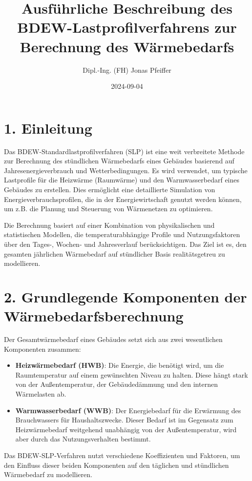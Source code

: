 \documentclass{article}
\title{Ausführliche Beschreibung des BDEW-Lastprofilverfahrens zur Berechnung des Wärmebedarfs}
\author{Dipl.-Ing. (FH) Jonas Pfeiffer}
\date{2024-09-04}
\begin{document}
\maketitle

\section*{1. Einleitung}
Das BDEW-Standardlastprofilverfahren (SLP) ist eine weit verbreitete Methode zur Berechnung des stündlichen Wärmebedarfs eines Gebäudes basierend auf Jahresenergieverbrauch und Wetterbedingungen. Es wird verwendet, um typische Lastprofile für die Heizwärme (Raumwärme) und den Warmwasserbedarf eines Gebäudes zu erstellen. Dies ermöglicht eine detaillierte Simulation von Energieverbrauchsprofilen, die in der Energiewirtschaft genutzt werden können, um z.B. die Planung und Steuerung von Wärmenetzen zu optimieren.

Die Berechnung basiert auf einer Kombination von physikalischen und statistischen Modellen, die temperaturabhängige Profile und Nutzungsfaktoren über den Tages-, Wochen- und Jahresverlauf berücksichtigen. Das Ziel ist es, den gesamten jährlichen Wärmebedarf auf stündlicher Basis realitätsgetreu zu modellieren.

\section*{2. Grundlegende Komponenten der Wärmebedarfsberechnung}
Der Gesamtwärmebedarf eines Gebäudes setzt sich aus zwei wesentlichen Komponenten zusammen:

\begin{itemize}
    \item \textbf{Heizwärmebedarf (HWB)}: Die Energie, die benötigt wird, um die Raumtemperatur auf einem gewünschten Niveau zu halten. Diese hängt stark von der Außentemperatur, der Gebäudedämmung und den internen Wärmelasten ab.
    \item \textbf{Warmwasserbedarf (WWB)}: Der Energiebedarf für die Erwärmung des Brauchwassers für Haushaltszwecke. Dieser Bedarf ist im Gegensatz zum Heizwärmebedarf weitgehend unabhängig von der Außentemperatur, wird aber durch das Nutzungsverhalten bestimmt.
\end{itemize}

Das BDEW-SLP-Verfahren nutzt verschiedene Koeffizienten und Faktoren, um den Einfluss dieser beiden Komponenten auf den täglichen und stündlichen Wärmebedarf zu modellieren.
\end{document}
